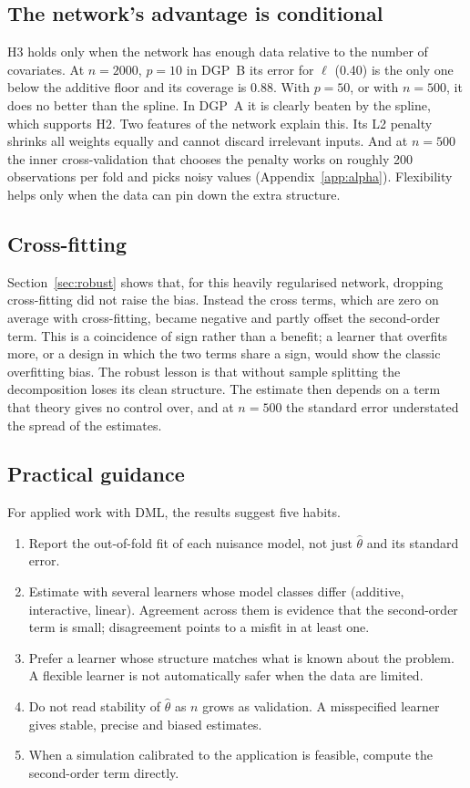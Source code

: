 \documentclass[11pt,a4paper]{article}
\begin{document}
\subsection{The network's advantage is conditional}

H3 holds only when the network has enough data relative to the number of covariates. At $n=2000$, $p=10$ in DGP~B its error for $\ell$ (0.40) is the only one below the additive floor and its coverage is 0.88. With $p=50$, or with $n=500$, it does no better than the spline. In DGP~A it is clearly beaten by the spline, which supports H2. Two features of the network explain this. Its L2 penalty shrinks all weights equally and cannot discard irrelevant inputs. And at $n=500$ the inner cross-validation that chooses the penalty works on roughly 200 observations per fold and picks noisy values (Appendix~\ref{app:alpha}). Flexibility helps only when the data can pin down the extra structure.

\subsection{Cross-fitting}

Section~\ref{sec:robust} shows that, for this heavily regularised network, dropping cross-fitting did not raise the bias. Instead the cross terms, which are zero on average with cross-fitting, became negative and partly offset the second-order term. This is a coincidence of sign rather than a benefit; a learner that overfits more, or a design in which the two terms share a sign, would show the classic overfitting bias. The robust lesson is that without sample splitting the decomposition loses its clean structure. The estimate then depends on a term that theory gives no control over, and at $n=500$ the standard error understated the spread of the estimates.

\subsection{Practical guidance}\label{sec:guidance}

For applied work with DML, the results suggest five habits.
\begin{enumerate}
\item Report the out-of-fold fit of each nuisance model, not just $\hat\theta$ and its standard error.
\item Estimate with several learners whose model classes differ (additive, interactive, linear). Agreement across them is evidence that the second-order term is small; disagreement points to a misfit in at least one.
\item Prefer a learner whose structure matches what is known about the problem. A flexible learner is not automatically safer when the data are limited.
\item Do not read stability of $\hat\theta$ as $n$ grows as validation. A misspecified learner gives stable, precise and biased estimates.
\item When a simulation calibrated to the application is feasible, compute the second-order term directly.
\end{enumerate}
\end{document}
